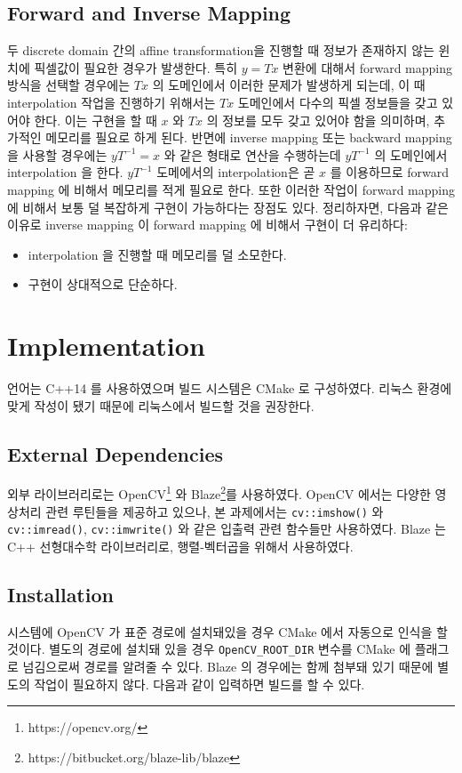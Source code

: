 \documentclass[a4paper, 12p]{paper}
\def\code#1{\texttt{#1}}
\begin{document}
\subsection{Forward and Inverse Mapping}
두 discrete domain 간의 affine transformation을 진행할 때 정보가 존재하지 않는 윈치에 픽셀값이 필요한 경우가 발생한다. 특히 $y = Tx$ 변환에 대해서 forward mapping 방식을 선택할 경우에는 $Tx$ 의 도메인에서 이러한 문제가 발생하게 되는데, 이 때 interpolation 작업을 진행하기 위해서는 $Tx$ 도메인에서 다수의 픽셀 정보들을 갖고 있어야 한다. 이는 구현을 할 때 $x$ 와 $Tx$ 의 정보를 모두 갖고 있어야 함을 의미하며, 추가적인 메모리를 필요로 하게 된다. 반면에 inverse mapping 또는 backward mapping 을 사용할 경우에는 $yT^{-1} = x$ 와 같은 형태로 연산을 수행하는데 $yT^{-1}$ 의 도메인에서 interpolation 을 한다. $yT^{-1}$ 도메에서의 interpolation은 곧 $x$ 를 이용하므로 forward mapping 에 비해서 메모리를 적게 필요로 한다. 또한 이러한 작업이 forward mapping 에 비해서 보통 덜 복잡하게 구현이 가능하다는 장점도 있다. 정리하자면, 다음과 같은 이유로 inverse mapping 이 forward mapping 에 비해서 구현이 더 유리하다:

\begin{itemize}
  \item interpolation 을 진행할 때 메모리를 덜 소모한다.
  \item 구현이 상대적으로 단순하다.
\end{itemize}

\section{Implementation}
언어는 C++14 를 사용하였으며 빌드 시스템은 CMake 로 구성하였다. 리눅스 환경에 맞게 작성이 됐기 때문에 리눅스에서 빌드할 것을 권장한다.

\subsection{External Dependencies}
외부 라이브러리로는 OpenCV\footnote{https://opencv.org/} 와 Blaze\footnote{https://bitbucket.org/blaze-lib/blaze}를 사용하였다. OpenCV 에서는 다양한 영상처리 관련 루틴들을 제공하고 있으나, 본 과제에서는 \code{cv::imshow()} 와 \code{cv::imread()}, \code{cv::imwrite()} 와 같은 입출력 관련 함수들만 사용하였다. Blaze 는 C++ 선형대수학 라이브러리로, 행렬-벡터곱을 위해서 사용하였다.

\subsection{Installation}
시스템에 OpenCV 가 표준 경로에 설치돼있을 경우 CMake 에서 자동으로 인식을 할 것이다. 별도의 경로에 설치돼 있을 경우 \code{OpenCV\_ROOT\_DIR} 변수를 CMake 에 플래그로 넘김으로써 경로를 알려줄 수 있다. Blaze 의 경우에는 함께 첨부돼 있기 때문에 별도의 작업이 필요하지 않다. 다음과 같이 입력하면 빌드를 할 수 있다. 
\end{document}
